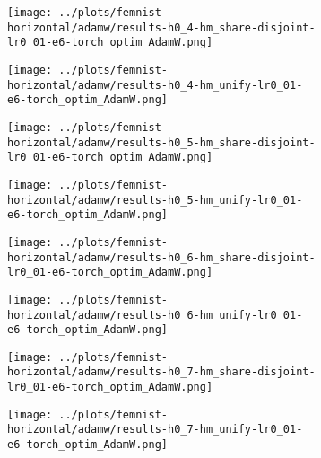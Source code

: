 \begin{figure}[htbp]  %
    \centering
    \begin{subfigure}[b]{0.47\textwidth}
        \centering
        \texttt{[image: ../plots/femnist-horizontal/adamw/results-h0\_4-hm\_share-disjoint-lr0\_01-e6-torch\_optim\_AdamW.png]}
    \end{subfigure}
    \hfill
    \begin{subfigure}[b]{0.47\textwidth}
        \centering
        \texttt{[image: ../plots/femnist-horizontal/adamw/results-h0\_4-hm\_unify-lr0\_01-e6-torch\_optim\_AdamW.png]}
    \end{subfigure}
\end{figure}
\begin{figure}[htbp]  %
    \centering
    \begin{subfigure}[b]{0.47\textwidth}
        \centering
        \texttt{[image: ../plots/femnist-horizontal/adamw/results-h0\_5-hm\_share-disjoint-lr0\_01-e6-torch\_optim\_AdamW.png]}
    \end{subfigure}
    \hfill
    \begin{subfigure}[b]{0.47\textwidth}
        \centering
        \texttt{[image: ../plots/femnist-horizontal/adamw/results-h0\_5-hm\_unify-lr0\_01-e6-torch\_optim\_AdamW.png]}
    \end{subfigure}
\end{figure}
\begin{figure}[htbp]  %
    \centering
    \begin{subfigure}[b]{0.47\textwidth}
        \centering
        \texttt{[image: ../plots/femnist-horizontal/adamw/results-h0\_6-hm\_share-disjoint-lr0\_01-e6-torch\_optim\_AdamW.png]}
    \end{subfigure}
    \hfill
    \begin{subfigure}[b]{0.47\textwidth}
        \centering
        \texttt{[image: ../plots/femnist-horizontal/adamw/results-h0\_6-hm\_unify-lr0\_01-e6-torch\_optim\_AdamW.png]}
    \end{subfigure}
\end{figure}
\begin{figure}[htbp]  %
    \centering
    \begin{subfigure}[b]{0.47\textwidth}
        \centering
        \texttt{[image: ../plots/femnist-horizontal/adamw/results-h0\_7-hm\_share-disjoint-lr0\_01-e6-torch\_optim\_AdamW.png]}
    \end{subfigure}
    \hfill
    \begin{subfigure}[b]{0.47\textwidth}
        \centering
        \texttt{[image: ../plots/femnist-horizontal/adamw/results-h0\_7-hm\_unify-lr0\_01-e6-torch\_optim\_AdamW.png]}
    \end{subfigure}
\end{figure}
